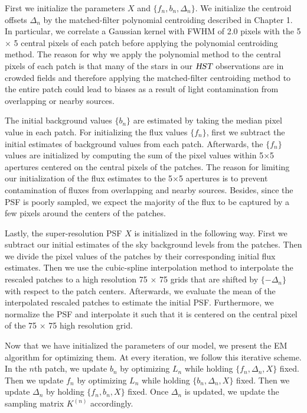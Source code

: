 \documentclass[onecolumn]{aastex61}
\newcommand{\project}[1]{{\textsl{#1}}}
\newcommand{\hst}{\project{HST}}
\begin{document}
First we initialize the parameters $X$ and $\{f_n , b_n , \Delta_n\}$. We initialize the centroid offsets ${\Delta_n}$ by the matched-filter polynomial centroiding 
described in Chapter 1. In particular, we correlate a Gaussian kernel with FWHM of 2.0 pixels with the 5 $\times$ 5 central pixels of each patch before applying 
the polynomial centroiding method. The reason for why we apply the polynomial method to the central pixels of each patch is that many of the stars in our $\hst$ observations 
are in crowded fields and therefore applying the matched-filter centroiding method to the entire patch could lead to biases as a result of light contamination from overlapping 
or nearby sources. 

The initial background values $\{b_n\}$ are estimated by taking the median pixel value in each patch. For initializing the flux values $\{f_n\}$, first we subtract the initial 
estimates of background values from each patch. Afterwards, the $\{f_n\}$ values are initialized by computing the sum of the pixel values within 5$\times$5 apertures centered on 
the central pixels of the patches. The reason for limiting our initialization of the flux estimates to the 5$\times$5 apertures is to prevent contamination of fluxes from 
overlapping and nearby sources. Besides, since the PSF is poorly sampled, we expect the majority of the flux to be captured by a few pixels around the centers of the patches. 

Lastly, the super-resolution PSF $X$ is initialized in the following way. First we subtract our initial estimates of the sky background levels from the patches. Then we divide the 
pixel values of the patches by their corresponding initial flux estimates. Then we use the cubic-spline interpolation method to interpolate the rescaled patches to a high resolution 
75 $\times$ 75 grids that are shifted by $\{-\Delta_n\}$ with respect to the patch centers. Afterwards, we evaluate the mean of the interpolated rescaled patches 
to estimate the initial PSF. Furthermore, we normalize the PSF and interpolate it such that it is centered on the central pixel of the 75 $\times$ 75 high resolution grid.  

Now that we have initialized the parameters of our model, we present the EM algorithm for optimizing them. At every iteration, we follow this 
iterative scheme. In the $n$th patch, we update $b_n$ by optimizing $L_n$ while holding $\{f_n, \Delta_n, X\}$ fixed. Then 
we update $f_n$ by optimizing $L_n$ while holding $\{b_n, \Delta_n, X\}$ fixed. Then we update $\Delta_n$ by holding $\{f_n, b_n, X\}$ fixed. 
Once $\Delta_n$ is updated, we update the sampling matrix $K^{(n)}$ accordingly. 
\end{document}
